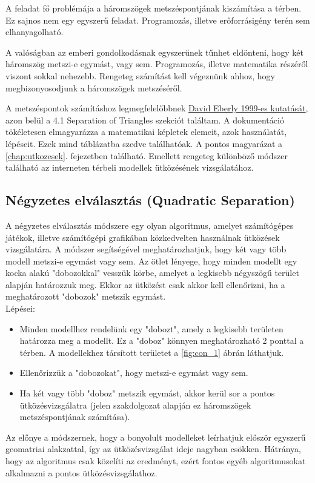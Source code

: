 
A feladat fő problémája a háromszögek metszéspontjának kiszámítása a térben. Ez sajnos nem egy egyszerű feladat. Programozás, illetve erőforrásigény terén sem elhanyagolható.

A valóságban az emberi gondolkodásnak egyszerűnek tűnhet eldönteni, hogy két háromszög metszi-e egymást, vagy sem. Programozás, illetve matematika részéről viszont sokkal nehezebb. Rengeteg számítást kell végeznünk ahhoz, hogy megbizonyosodjunk a háromszögek metszéséről.

A metszéspontok számításhoz legmegfelelőbbnek \href{https://www.geometrictools.com/Documentation/DynamicCollisionDetection.pdf}{David Eberly 1999-es kutatását}, azon belül a 4.1 Separation of Triangles\cite{triangles} szekciót találtam. A dokumentáció tökéletesen elmagyarázza a matematikai képletek elemeit, azok használatát, lépéseit. Ezek mind táblázatba szedve találhatóak. A pontos magyarázat a \ref{chap:utkozesek}. fejezetben található. Emellett rengeteg különböző módszer található az interneten térbeli modellek ütközésének vizsgálatához.\\
\newpage
\subsection{Négyzetes elválasztás (Quadratic Separation)}
\label{chap:quad}
A négyzetes elválasztás módszere egy olyan algoritmus, amelyet számítógépes játékok, illetve számítógépi grafikában közkedvelten használnak ütközések vizsgálatára.
A módszer segítségével meghatározhatjuk, hogy két vagy több modell metszi-e egymást vagy sem.
Az ötlet lényege, hogy minden modellt egy kocka alakú "dobozokkal" vesszük körbe, amelyet a legkisebb négyszögű terület alapján határozzuk meg. Ekkor az ütközést csak akkor kell ellenőrizni, ha a meghatározott "dobozok" metszik egymást.\\
Lépései:
\begin{itemize}
\item Minden modellhez rendelünk egy "dobozt", amely a legkisebb területen határozza meg a modellt. Ez a "doboz" könnyen meghatározható 2 ponttal a térben. A modellekhez társított területet a \ref{fig:con_1} ábrán láthatjuk.

\item Ellenőrizzük a "dobozokat", hogy metszi-e egymást vagy sem.

\item Ha két vagy több "doboz" metszik egymást, akkor kerül sor a pontos ütközésvizsgálatra (jelen szakdolgozat alapján ez háromszögek metszéspontjának számítása).
\end{itemize}
Az előnye a módszernek, hogy a bonyolult modelleket leírhatjuk először egyszerű geomatriai alakzattal, így az ütközésvizsgálat ideje nagyban csökken. Hátránya, hogy az algoritmus csak közelíti az eredményt, ezért fontos egyéb algoritmusokat alkalmazni a pontos ütközésvizsgálathoz.


